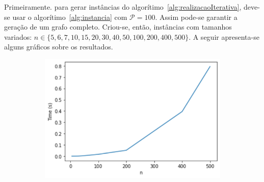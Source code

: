 \documentclass[a4paper,12pt]{article}
\begin{document}
	Primeiramente. para gerar instâncias do algorítimo~\ref{alg:realizacaoIterativa}, deve-se usar o algorítimo~\ref{alg:instancia} com $\mathcal{P} = 100$. Assim pode-se garantir a geração de um grafo completo. Criou-se, então, instâncias com tamanhos variados: $n \in \{5, 6, 7,10,15,20,30,40,50,100,200,400,500\}$. A seguir apresenta-se alguns gráficos sobre os resultados.
	
	\begin{figure}[H]
		\begin{center}
			\begin{minipage}{0.45 \linewidth}
				\begin{figure}[H]
					\begin{center}
						\includegraphics[width=1\linewidth]{figures/tempoTri.png}
					\end{center}
				\end{figure}
			\end{minipage}
			\hspace{0.1cm}
			\begin{minipage}{0.45 \linewidth}
				

\end{minipage}
\end{center}
\end{figure}
\end{document}
